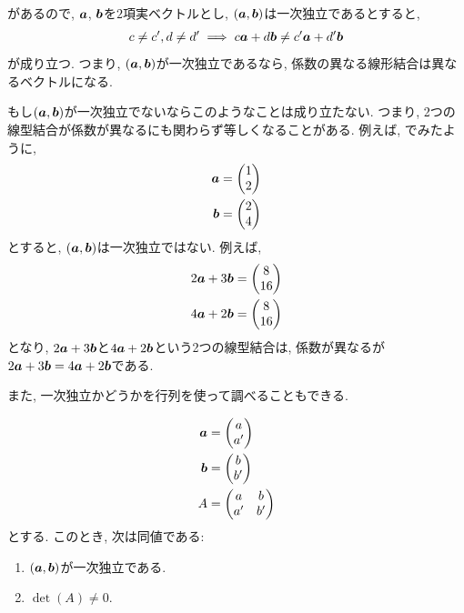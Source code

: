 \begin{remark}
  があるので,
  $\boldsymbol{a}$, $\boldsymbol{b}$を$2$項実ベクトルとし,
  $(\boldsymbol{a},\boldsymbol{b})$は一次独立であるとすると,
  \begin{align*}
    c\neq c', d\neq d' \implies c\boldsymbol{a} + d\boldsymbol{b}\neq c'\boldsymbol{a}+d'\boldsymbol{b}
  \end{align*}
  が成り立つ.
  つまり, $(\boldsymbol{a},\boldsymbol{b})$が一次独立であるなら,
  係数の異なる線形結合は異なるベクトルになる.
  
  もし$(\boldsymbol{a},\boldsymbol{b})$が一次独立でないならこのようなことは成り立たない.
  つまり, 2つの線型結合が係数が異なるにも関わらず等しくなることがある.
  例えば, でみたように,
  \begin{align*}
  \boldsymbol{a}&=\begin{pmatrix}1\\2\end{pmatrix}\\
  \boldsymbol{b}&=\begin{pmatrix}2\\4\end{pmatrix}
  \end{align*}
  とすると,
  $(\boldsymbol{a},\boldsymbol{b})$は一次独立ではない.
  例えば,
  \begin{align*}
  2\boldsymbol{a}+3\boldsymbol{b}&=\begin{pmatrix}8\\16\end{pmatrix}\\
  4\boldsymbol{a}+2\boldsymbol{b}&=\begin{pmatrix}8\\16\end{pmatrix}
  \end{align*}
  となり,
  $2\boldsymbol{a}+3\boldsymbol{b}$と$4\boldsymbol{a}+2\boldsymbol{b}$という2つの線型結合は,
  係数が異なるが
  $2\boldsymbol{a}+3\boldsymbol{b}=4\boldsymbol{a}+2\boldsymbol{b}$である.
\end{remark}

また, 一次独立かどうかを行列を使って調べることもできる.
\begin{theorem}
  \label{thm:linindep:det}
  \begin{align*}
    \boldsymbol{a}&=\begin{pmatrix}a\\a'\end{pmatrix}\\
    \boldsymbol{b}&=\begin{pmatrix}b\\b'\end{pmatrix}\\
    A&=\begin{pmatrix}a&b\\a'&b'\end{pmatrix}
  \end{align*}
  とする.  このとき, 次は同値である:
  \begin{enumerate}
  \item \label{thm:linindep:det:item:linindep}
    $(\boldsymbol{a},\boldsymbol{b})$が一次独立である.
  \item\label{thm:linindep:det:item:det}
    $\det(A)\neq 0$.
  \end{enumerate}
\end{theorem}

